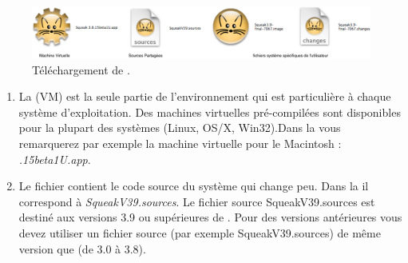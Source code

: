 \documentclass[a4paper,10pt,twoside]{book}
\begin{document}
\begin{figure}[htb]
\centerline {\includegraphics[width=\textwidth]{annotatedDownload}}
\caption{Téléchargement de \sq. \label{fig:download}}
\end{figure}

\begin{enumerate}


\item La  (VM) est la seule partie de l'environnement qui est particulière à chaque système d'exploitation. Des machines virtuelles pré-compilées sont disponibles pour la plupart des systèmes (Linux, OS/X, Win32).Dans la  vous remarquerez par exemple la machine virtuelle pour le Macintosh : \textit{.15beta1U.app}.


  \item Le fichier  contient le code source du système \sq qui change peu. Dans la  il correspond à \emph{SqueakV39.sources}. Le fichier source SqueakV39.sources est destiné aux versions 3.9 ou supérieures de \sq. Pour des versions antérieures vous devez utiliser un fichier source (par exemple SqueakV39.sources) de même version que \sq (de 3.0 à 3.8). 



\end{enumerate}
\end{document}
